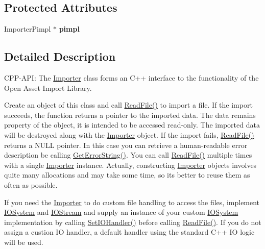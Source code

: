 \subsection*{Protected Attributes}
\begin{DoxyCompactItemize}
\item 
Importer\+Pimpl $\ast$ {\bfseries pimpl}\hypertarget{class_assimp_1_1_importer_a3928bb8d375fd676dd5dbe33382e46ce}{}\label{class_assimp_1_1_importer_a3928bb8d375fd676dd5dbe33382e46ce}

\end{DoxyCompactItemize}


\subsection{Detailed Description}
C\+P\+P-\/\+A\+PI\+: The \hyperlink{class_assimp_1_1_importer}{Importer} class forms an C++ interface to the functionality of the Open Asset Import Library.

Create an object of this class and call \hyperlink{class_assimp_1_1_importer_a174418ab41d5b8bc51a044895cb991e5}{Read\+File()} to import a file. If the import succeeds, the function returns a pointer to the imported data. The data remains property of the object, it is intended to be accessed read-\/only. The imported data will be destroyed along with the \hyperlink{class_assimp_1_1_importer}{Importer} object. If the import fails, \hyperlink{class_assimp_1_1_importer_a174418ab41d5b8bc51a044895cb991e5}{Read\+File()} returns a N\+U\+LL pointer. In this case you can retrieve a human-\/readable error description be calling \hyperlink{class_assimp_1_1_importer_a23bab5ba8cb9b6886c690a610766668b}{Get\+Error\+String()}. You can call \hyperlink{class_assimp_1_1_importer_a174418ab41d5b8bc51a044895cb991e5}{Read\+File()} multiple times with a single \hyperlink{class_assimp_1_1_importer}{Importer} instance. Actually, constructing \hyperlink{class_assimp_1_1_importer}{Importer} objects involves quite many allocations and may take some time, so it\textquotesingle{}s better to reuse them as often as possible.

If you need the \hyperlink{class_assimp_1_1_importer}{Importer} to do custom file handling to access the files, implement \hyperlink{class_assimp_1_1_i_o_system}{I\+O\+System} and \hyperlink{class_assimp_1_1_i_o_stream}{I\+O\+Stream} and supply an instance of your custom \hyperlink{class_assimp_1_1_i_o_system}{I\+O\+System} implementation by calling \hyperlink{class_assimp_1_1_importer_a1161f46318af18bb86dfe0fc3edea4df}{Set\+I\+O\+Handler()} before calling \hyperlink{class_assimp_1_1_importer_a174418ab41d5b8bc51a044895cb991e5}{Read\+File()}. If you do not assign a custion IO handler, a default handler using the standard C++ IO logic will be used.


